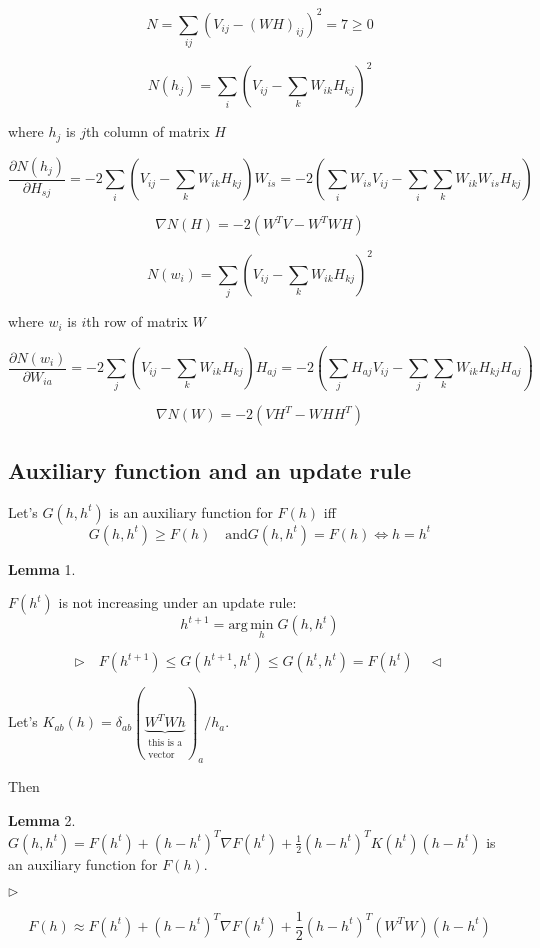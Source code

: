 \documentclass{extreport}
\begin{document}
\[
  N = \sum_{ij}
  \left(
    V_{ij} - (WH)_{ij}
  \right)^2
  = 7 \geqslant 0
\]

\[
  N(h_j) = \sum_{i}
  \left(
    V_{ij} - \sum_{k}W_{ik}H_{kj}
  \right)^2
\]

where $h_j$ is $j$th column of matrix $H$

\[
  \frac{\partial N(h_j)}{\partial H_{sj}} =
  -2 \sum_i
    \left(
      V_{ij} - \sum_k W_{ik}H_{kj}
    \right)
  W_{is} =
  -2
    \left(
      \sum_i W_{is}V_{ij} - \sum_i\sum_kW_{ik}W_{is}H_{kj}
    \right)
\]

\[
  \nabla N(H) = -2 ( W^TV - W^TWH )
\]

\[
  N(w_i) = \sum_j \left( V_{ij} - \sum_k W_{ik}H_{kj} \right)^2
\]

where $w_i$ is $i$th row of matrix $W$

\[
  \frac{\partial N(w_i)}{\partial W_{ia}} =
  -2 \sum_j
    \left(
      V_{ij} - \sum_k W_{ik}H_{kj}
    \right)
  H_{aj} =
  -2
    \left(
      \sum_j H_{aj}V_{ij} - \sum_j \sum_k W_{ik}H_{kj}H_{aj}
    \right)
\]

\[
  \nabla N(W) = -2 ( VH^T - WHH^T )
\]

\subsection{Auxiliary function and an update rule}

Let's $G(h, h^t)$ is an auxiliary function for $F(h)$ iff
\[
  G(h,h^t) \geqslant F(h) \quad \text{and}
  G(h,h^t) = F(h) \iff h = h^t
\]

\textbf{Lemma} 1.

$F(h^t)$ is not increasing under an update rule:
\[
  h^{t+1} = \text{arg} \, \underset{h}{\text{min}} \; G(h,h^t)
\]

\[
  \rhd \quad
    F(h^{t+1}) \leqslant G(h^{t+1},h^t) \leqslant G(h^t,h^t) = F(h^t) \quad
  \lhd
\]

Let's $K_{ab}(h) =
  \delta_{ab}
  (\underbrace{W^T W h}_{\substack{\text{this is a}\\ \text{vector}}})_a
  / h_a$.

Then

\textbf{Lemma} 2.
$G(h,h^t) = F(h^t) + (h - h^t)^T \nabla F(h^t)
  + \frac{1}{2} (h - h^t)^T K(h^t) (h - h^t)$
is an auxiliary function for $F(h)$.

$\rhd$

$$F(h) \approx F(h^t) + (h - h^t)^T \nabla F(h^t)
  + \frac{1}{2} (h - h^t)^T (W^TW) (h - h^t)$$
\end{document}
